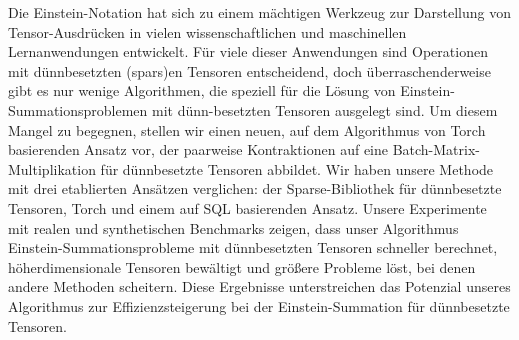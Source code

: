 Die Einstein-Notation hat sich zu einem mächtigen Werkzeug zur Darstellung von Tensor-Ausdrücken in vielen
wissenschaftlichen und maschinellen Lernanwendungen entwickelt. Für viele dieser Anwendungen sind
Operationen mit dünnbesetzten (spars)en Tensoren entscheidend, doch überraschenderweise gibt es nur
wenige Algorithmen, die speziell für die Lösung von Einstein-Summationsproblemen mit dünn-besetzten
Tensoren ausgelegt sind. Um diesem Mangel zu begegnen, stellen wir einen neuen, auf dem Algorithmus von
Torch basierenden Ansatz vor, der paarweise Kontraktionen auf eine Batch-Matrix-Multiplikation für
dünnbesetzte Tensoren abbildet. Wir haben unsere Methode mit drei etablierten Ansätzen verglichen: der
Sparse-Bibliothek für dünnbesetzte Tensoren, Torch und einem auf SQL basierenden Ansatz. Unsere Experimente
mit realen und synthetischen Benchmarks zeigen, dass unser Algorithmus Einstein-Summationsprobleme mit
dünnbesetzten Tensoren schneller berechnet, höherdimensionale Tensoren bewältigt und größere Probleme löst,
bei denen andere Methoden scheitern. Diese Ergebnisse unterstreichen das Potenzial unseres Algorithmus
zur Effizienzsteigerung bei der Einstein-Summation für dünnbesetzte Tensoren.